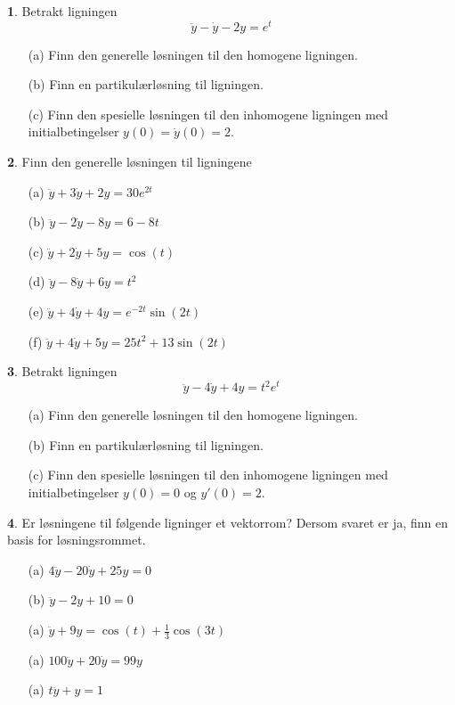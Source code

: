 \documentclass{article}
\theoremstyle{definition}
\newtheorem{oppg}{}
\theoremstyle{remark}
\begin{document}
\begin{multicols*}{2}
\begin{oppg}  
  Betrakt ligningen
  \begin{equation*}
    \ddot{y} - \dot{y} - 2y = e^t
  \end{equation*}
  \begin{itemize}
    \item[(a)] Finn den generelle løsningen til den homogene ligningen.
    \item[(b)] Finn en partikulærløsning til ligningen.
    \item[(c)] Finn den spesielle løsningen til den inhomogene ligningen med initialbetingelser $y(0) = \dot{y}(0) = 2$.
  \end{itemize}
\end{oppg}

\begin{oppg}  
  Finn den generelle løsningen til ligningene
  \begin{itemize}
    \item[(a)] $\ddot{y} + 3\dot{y} + 2y = 30e^{2t}$
    \item[(b)] $\ddot{y} - 2\dot{y} - 8y = 6 - 8t$
    \item[(c)] $\ddot{y} + 2\dot{y} + 5y = \cos(t)$
    \item[(d)] $\ddot{y} - 8\dot{y} + 6y = t^2$
    \item[(e)] $\ddot{y} + 4\dot{y} + 4y = e^{-2t} \sin(2t)$
    \item[(f)] $\ddot{y} + 4\dot{y} + 5y = 25t^2 + 13\sin(2t)$ 
  \end{itemize}
\end{oppg}

\begin{oppg}  
  Betrakt ligningen
  \begin{equation*}
    \ddot{y} - 4\dot{y} + 4y = t^2 e^t
  \end{equation*}
  \begin{itemize}
    \item[(a)] Finn den generelle løsningen til den homogene ligningen.
    \item[(b)] Finn en partikulærløsning til ligningen.
    \item[(c)] Finn den spesielle løsningen til den inhomogene ligningen med initialbetingelser $y(0) = 0$ og $y'(0) = 2$.
  \end{itemize}
\end{oppg}

\begin{oppg}
  Er løsningene til følgende ligninger et vektorrom? Dersom svaret er ja, finn en basis for løsningsrommet.
  \begin{itemize}
    \item[(a)] $4\ddot{y} - 20\dot{y} + 25y = 0$
    \item[(b)] $\ddot{y} - 2y + 10 = 0$
    \item[(a)] $\ddot{y} + 9y = \cos(t) + \frac{1}{3} \cos(3t)$
    \item[(a)] $100\ddot{y} + 20\dot{y} = 99y$
    \item[(a)] $t \ddot{y} + y = 1$ 
  \end{itemize}
\end{oppg}


\end{multicols*}
\end{document}
